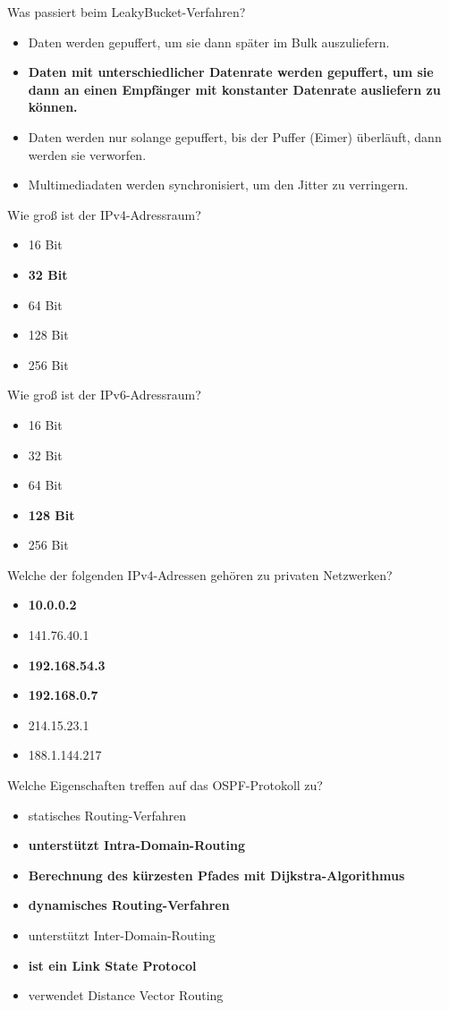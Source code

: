 \documentclass{article}
\begin{document}
	Was passiert beim LeakyBucket-Verfahren? 
	\begin{itemize}
		\item Daten werden gepuffert, um sie dann später im Bulk auszuliefern.
		\item \textbf{Daten mit unterschiedlicher Datenrate werden gepuffert, um sie dann an einen Empfänger mit konstanter Datenrate ausliefern zu können.}
		\item Daten werden nur solange gepuffert, bis der Puffer (Eimer) überläuft, dann werden sie verworfen.
		\item Multimediadaten werden synchronisiert, um den Jitter zu verringern.
	\end{itemize}

	Wie groß ist der IPv4-Adressraum? 
	\begin{itemize}
		\item 16 Bit
		\item \textbf{32 Bit}
		\item 64 Bit
		\item 128 Bit
		\item 256 Bit
	\end{itemize}

	Wie groß ist der IPv6-Adressraum? 
	\begin{itemize}
		\item 16 Bit
		\item 32 Bit
		\item 64 Bit
		\item \textbf{128 Bit}
		\item 256 Bit
	\end{itemize}

	Welche der folgenden IPv4-Adressen gehören zu privaten Netzwerken? 
	\begin{itemize}
		\item \textbf{10.0.0.2}
		\item 141.76.40.1
		\item \textbf{192.168.54.3}
		\item \textbf{192.168.0.7}
		\item 214.15.23.1
		\item 188.1.144.217
	\end{itemize}

	Welche Eigenschaften treffen auf das OSPF-Protokoll zu? 
	\begin{itemize}
		\item statisches Routing-Verfahren
		\item \textbf{unterstützt Intra-Domain-Routing}
		\item \textbf{Berechnung des kürzesten Pfades mit Dijkstra-Algorithmus}
		\item \textbf{dynamisches Routing-Verfahren}
		\item unterstützt Inter-Domain-Routing
		\item \textbf{ist ein Link State Protocol}
		\item verwendet Distance Vector Routing
	\end{itemize}
\end{document}
